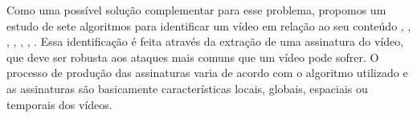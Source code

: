 Como uma possível solução complementar para esse problema, propomos um estudo de sete algoritmos para identificar um vídeo em relação ao seu conteúdo \cite{hua2004robust}, \cite{lee2008robust}, \cite{cook2011efficient}, \cite{mao2015sceneframe}, \cite{kim2014rotation}, \cite{Dutta2013}, \cite{minetto2007reliable}. Essa identificação é feita através da extração de uma assinatura do vídeo, que deve ser robusta aos ataques mais comuns que um vídeo pode sofrer. O processo de produção das assinaturas varia de acordo com o algoritmo utilizado e as assinaturas são basicamente características locais, globais, espaciais ou temporais dos vídeos. 






    
    








